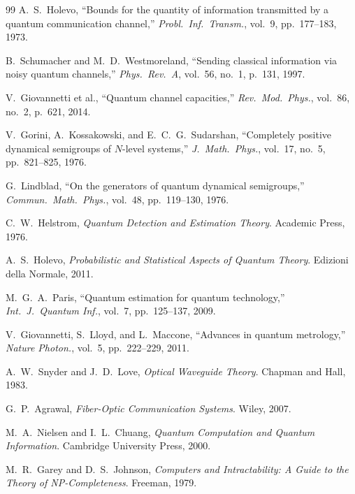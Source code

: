 \documentclass[12pt,a4paper]{article}
\theoremstyle{definition}
\theoremstyle{plain}
\begin{document}
\begin{thebibliography}{99}
A.~S.~Holevo, ``Bounds for the quantity of information transmitted by a quantum communication channel,'' \textit{Probl.\ Inf.\ Transm.}, vol.~9, pp.~177--183, 1973.

B.~Schumacher and M.~D.~Westmoreland, ``Sending classical information via noisy quantum channels,'' \textit{Phys.\ Rev.\ A}, vol.~56, no.~1, p.~131, 1997.

V.~Giovannetti et al., ``Quantum channel capacities,'' \textit{Rev.\ Mod.\ Phys.}, vol.~86, no.~2, p.~621, 2014.

V.~Gorini, A.~Kossakowski, and E.~C.~G.~Sudarshan, ``Completely positive dynamical semigroups of $N$-level systems,'' \textit{J.\ Math.\ Phys.}, vol.~17, no.~5, pp.~821--825, 1976.

G.~Lindblad, ``On the generators of quantum dynamical semigroups,'' \textit{Commun.\ Math.\ Phys.}, vol.~48, pp.~119--130, 1976.

C.~W.~Helstrom, \textit{Quantum Detection and Estimation Theory}. Academic Press, 1976.

A.~S.~Holevo, \textit{Probabilistic and Statistical Aspects of Quantum Theory}. Edizioni della Normale, 2011.

M.~G.~A.~Paris, ``Quantum estimation for quantum technology,'' \textit{Int.\ J.\ Quantum Inf.}, vol.~7, pp.~125--137, 2009.

V.~Giovannetti, S.~Lloyd, and L.~Maccone, ``Advances in quantum metrology,'' \textit{Nature Photon.}, vol.~5, pp.~222--229, 2011.

A.~W.~Snyder and J.~D.~Love, \textit{Optical Waveguide Theory}. Chapman and Hall, 1983.

G.~P.~Agrawal, \textit{Fiber-Optic Communication Systems}. Wiley, 2007.

M.~A.~Nielsen and I.~L.~Chuang, \textit{Quantum Computation and Quantum Information}. Cambridge University Press, 2000.

M.~R.~Garey and D.~S.~Johnson, \textit{Computers and Intractability: A Guide to the Theory of NP-Completeness}. Freeman, 1979.


\end{thebibliography}
\end{document}
